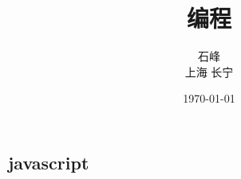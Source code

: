 \documentclass[12pt, oneside, b5paper]{book}
\title{编程}
\author{石峰\\
			上海 长宁}
\date{\today}
\begin{document}
  
\begin{CJK}{UTF8}{gkai}
\maketitle

\part{javascript}






  
		
\newpage
\end{CJK}  
\end{document}
